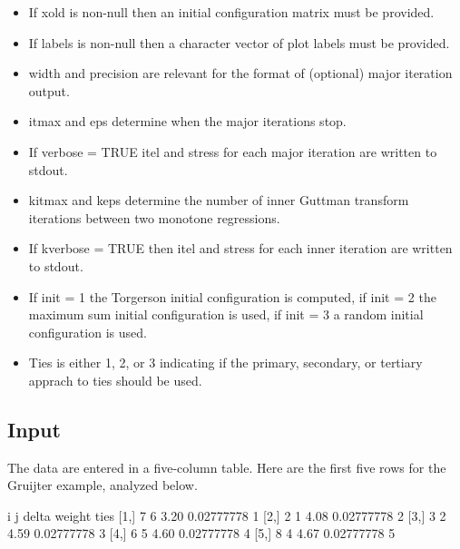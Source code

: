 \documentclass[
  12pt,
]{article}
\newenvironment{Shaded}{\begin{snugshade}}{\end{snugshade}}
\newcommand{\DecValTok}[1]{\textcolor[rgb]{0.00,0.00,0.81}{#1}}
\newcommand{\FloatTok}[1]{\textcolor[rgb]{0.00,0.00,0.81}{#1}}
\newcommand{\NormalTok}[1]{#1}
\providecommand{\tightlist}{%
  \setlength{\itemsep}{0pt}\setlength{\parskip}{0pt}}
\begin{document}
\begin{itemize}
\tightlist
\item
  If xold is non-null then an initial configuration matrix must be provided.
\item
  If labels is non-null then a character vector of plot labels must be provided.
\item
  width and precision are relevant for the format of (optional) major iteration output.
\item
  itmax and eps determine when the major iterations stop.
\item
  If verbose = TRUE itel and stress for each major iteration are
  written to stdout.
\item
  kitmax and keps determine the number of inner Guttman transform iterations
  between two monotone regressions.
\item
  If kverbose = TRUE then itel and stress for each inner iteration are written to stdout.
\item
  If init = 1 the Torgerson initial configuration is computed, if init = 2
  the maximum sum initial configuration is used, if init = 3 a random initial configuration
  is used.
\item
  Ties is either 1, 2, or 3 indicating if the primary, secondary, or tertiary
  apprach to ties should be used.
\end{itemize}

\subsection{Input}\label{input}

The data are entered in a five-column table. Here are the first five rows for
the Gruijter example, analyzed below.

\begin{Shaded}
\begin{Highlighting}[]
\NormalTok{     i j delta     weight ties}
\NormalTok{[}\DecValTok{1}\NormalTok{,] }\DecValTok{7} \DecValTok{6}  \FloatTok{3.20} \FloatTok{0.02777778}    \DecValTok{1}
\NormalTok{[}\DecValTok{2}\NormalTok{,] }\DecValTok{2} \DecValTok{1}  \FloatTok{4.08} \FloatTok{0.02777778}    \DecValTok{2}
\NormalTok{[}\DecValTok{3}\NormalTok{,] }\DecValTok{3} \DecValTok{2}  \FloatTok{4.59} \FloatTok{0.02777778}    \DecValTok{3}
\NormalTok{[}\DecValTok{4}\NormalTok{,] }\DecValTok{6} \DecValTok{5}  \FloatTok{4.60} \FloatTok{0.02777778}    \DecValTok{4}
\NormalTok{[}\DecValTok{5}\NormalTok{,] }\DecValTok{8} \DecValTok{4}  \FloatTok{4.67} \FloatTok{0.02777778}    \DecValTok{5}
\end{Highlighting}
\end{Shaded}
\end{document}
